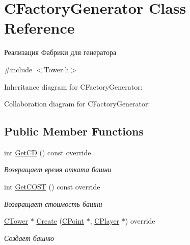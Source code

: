 \hypertarget{classCFactoryGenerator}{}\section{C\+Factory\+Generator Class Reference}
\label{classCFactoryGenerator}


Реализация Фабрики для генератора  




{\ttfamily \#include $<$Tower.\+h$>$}



Inheritance diagram for C\+Factory\+Generator\+:


Collaboration diagram for C\+Factory\+Generator\+:
\subsection*{Public Member Functions}
\begin{DoxyCompactItemize}
\item 
int \hyperlink{classCFactoryGenerator_a961030e43bfe76b44298653f4416d476}{Get\+CD} () const override\hypertarget{classCFactoryGenerator_a961030e43bfe76b44298653f4416d476}{}\label{classCFactoryGenerator_a961030e43bfe76b44298653f4416d476}

\begin{DoxyCompactList}\small\item\em Возвращает время отката башни \end{DoxyCompactList}\item 
int \hyperlink{classCFactoryGenerator_a3a7c3495c21a84c426d301b91c4b3087}{Get\+C\+O\+ST} () const override\hypertarget{classCFactoryGenerator_a3a7c3495c21a84c426d301b91c4b3087}{}\label{classCFactoryGenerator_a3a7c3495c21a84c426d301b91c4b3087}

\begin{DoxyCompactList}\small\item\em Возвращает стоимость башни \end{DoxyCompactList}\item 
\hyperlink{classCTower}{C\+Tower} $\ast$ \hyperlink{classCFactoryGenerator_a0c452d7692bf9654d952f6beb9f29645}{Create} (\hyperlink{classCPoint}{C\+Point} $\ast$, \hyperlink{classCPlayer}{C\+Player} $\ast$) override
\begin{DoxyCompactList}\small\item\em Создает башню \end{DoxyCompactList}\end{DoxyCompactItemize}


